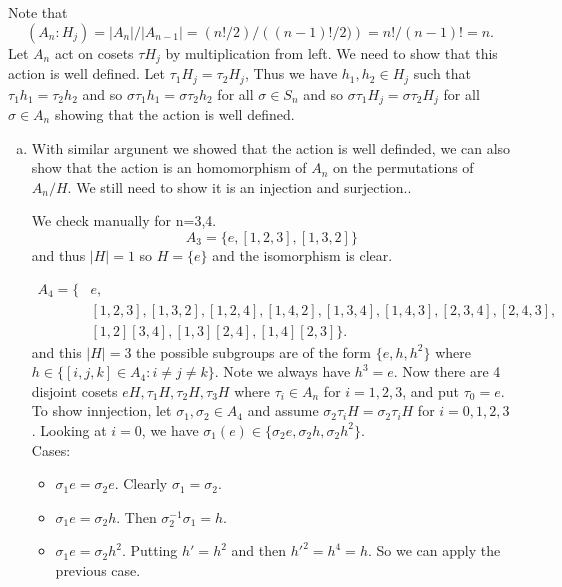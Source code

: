 \documentclass[12pt]{book}
\newcounter{myenumi}
\newenvironment{myenumerate}
{\begin{enumerate}
 \setcounter{enumi}{\themyenumi}
}
{\setcounter{myenumi}{\theenumi}
 \end{enumerate}}
\begin{document}
\begin{myenumerate}
Note that 
\begin{equation*}
(A_n: H_j) = |A_n|/|A_{n-1}| = (n!/2)/\left((n-1)!/2)\right) = n!/(n-1)! = n.
\end{equation*}
Let \(A_n\) act on cosets \(\tau H_j\) by multiplication from left.
We need to show that this action is well defined.
Let \(\tau_1 H_j = \tau_2 H_j\),
Thus we have \(h_1,h_2\in H_j\) such that  
\(\tau_1 h_1 = \tau_2 h_2\)
and so
\(\sigma\tau_1 h_1 = \sigma\tau_2 h_2\) for all \(\sigma \in S_n\)
and so 
\(\sigma\tau_1 H_j = \sigma\tau_2 H_j\) for all \(\sigma \in A_n\)
showing that the action is well defined.
\begin{enumerate}[(a)]
\item
With similar argunent we showed that the action is well definded,
we can also show that the action is an homomorphism of \(A_n\)
on the permutations of \(A_n/H\).
We still need to show it is an injection and surjection..

We check manually for n=3,4.
\begin{equation*}
A_3 = \{e, [1,2,3], [1, 3, 2]\}
\end{equation*}
and thus \(|H|=1\) so \(H=\{e\}\) and the isomorphism is clear.

\begin{align*}
A_4 = \{&e, \\
  &[1,2,3], [1, 3, 2], [1,2,4], [1, 4, 2], [1, 3, 4], [1, 4, 3], 
    [2, 3, 4], [2, 4, 3], \\
  &[1, 2][3, 4], [1, 3][2, 4], [1, 4][2, 3]\}.
\end{align*}
and this \(|H|=3\) the possible subgroups are of the 
form \(\{e, h, h^2\}\) where 
\(h \in \{[i,j,k]\in A_4: i\neq j \neq k\}\).
Note we always have \(h^3=e\).
Now there are 4 disjoint cosets \(eH, \tau_1 H, \tau_2 H, \tau_3 H\)
where \(\tau_i \in A_n\) for \(i=1,2,3\), and put \(\tau_0 = e\).
To show innjection, let \(\sigma_1, \sigma_2 \in A_4\) 
and assume \(\sigma_2\tau_i H = \sigma_2\tau_i H\) for \(i=0,1,2,3\).
Looking at \(i=0\), we have 
\(\sigma_1(e) \in \{\sigma_2 e, \sigma_2 h, \sigma_2 h^2\}\).\\
Cases:
\begin{itemize}
\item \(\sigma_1 e = \sigma_2 e\). Clearly \(\sigma_1 = \sigma_2\).
\item \(\sigma_1 e = \sigma_2 h\). Then \(\sigma_2^{-1}\sigma_1 = h\).
\item \(\sigma_1 e = \sigma_2 h^2\). 
  Putting \(h' = h^2\) and then \(h'^2 = h^4 = h\).
  So we can apply the previous case.
\end{itemize}


\end{enumerate}
\end{myenumerate}
\end{document}
